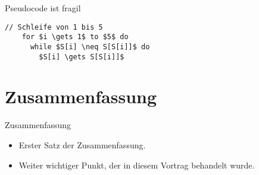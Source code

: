 \documentclass{beamer}
\begin{document}
\begin{frame}[fragile]{Pseudocode ist fragil}
  \begin{lstlisting}[style=pseudo,gobble=4]
    // Schleife von 1 bis 5
    for $i \gets 1$ to $5$ do
      while $S[i] \neq S[S[i]]$ do
        $S[i] \gets S[S[i]]$
  \end{lstlisting}
\end{frame}

\section*{Zusammenfassung}

\begin{frame}{Zusammenfassung}
  \begin{itemize}
    \item Erster Satz der \alert{Zusammenfassung}.
    \item Weiter wichtiger Punkt, der in diesem Vortrag behandelt wurde.
  \end{itemize}
\end{frame}
\end{document}
